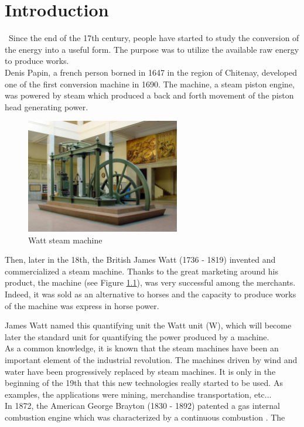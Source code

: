 \graphicspath{{Chapitre_2/Images/}}
\chapter{Introduction}\label{introduction}
\quad\, Since the end of the 17th century, people have started to study the conversion of the energy into a useful form. The purpose was to utilize the available raw energy to produce works.\\

Denis Papin, a french person borned in 1647 in the region of Chitenay, developed one of the first conversion machine in 1690. The machine, a steam piston engine, was powered by steam which produced a back and forth movement of the piston head generating power.

\begin{figure}[h]
    \centering
    \includegraphics[width=0.6\textwidth]{Chapitre_1/Images/Maquina_vapor_Watt_ETSIIM.jpg}
    \caption{Watt steam machine\cite{Watt}}
    \label{fig:Watt}
\end{figure}

Then, later in the 18th, the British James Watt (1736 - 1819) invented and commercialized a steam machine. Thanks to the great marketing around his product, the machine (see Figure \ref{fig:Watt}), was very successful among the merchants. Indeed, it was sold as an alternative to horses and the capacity to produce works of the machine was express in horse power. 

James Watt named this quantifying unit the Watt unit (W), which will become later the standard unit for quantifying the power produced by a machine.\\

As a common knowledge, it is known that the steam machines have been an important element of the industrial revolution. The machines driven by wind and water have been progressively replaced by steam machines. It is only in the beginning of the 19th that this new technologies really started to be used. As examples, the applications were mining, merchandise transportation, etc...\\

In 1872, the American George Brayton (1830 - 1892) patented a gas internal combustion engine which was characterized by a continuous combustion \cite{Boles2006}. The  